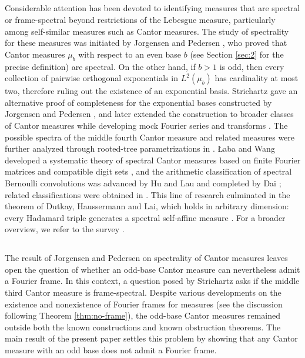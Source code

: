 \documentclass[reqno,a4paper,12pt]{amsart}
\begin{document}
\subsection{}
Considerable attention has been devoted to identifying measures that are spectral or frame-spectral beyond restrictions of the Lebesgue measure, particularly among self-similar measures such as Cantor measures. The study of spectrality for these measures was initiated by
Jorgensen and Pedersen \cite{JorgensenPedersen98}, who proved that Cantor measures $\mu_b$ with respect to an even base $b$ (see Section \ref{sec:2} for the precise definition) are spectral. On the other hand, if $b>1$ is odd, then every collection of pairwise orthogonal exponentials in $L^2(\mu_b)$ has cardinality at most two, therefore ruling out the existence of an exponential basis. Strichartz gave an alternative proof of completeness for the exponential bases constructed by Jorgensen and Pedersen \cite{Strichartz98}, and later extended the construction to broader classes of Cantor measures while developing mock Fourier series and transforms \cite{Strichartz00}. The possible spectra of the middle fourth Cantor measure and related measures were further analyzed through rooted-tree parametrizations in \cite{DutkayHanSun09,Dai16}.  Łaba and Wang developed a systematic theory of spectral Cantor measures based on finite Fourier matrices and compatible digit sets \cite{LabaWang02}, and the arithmetic classification of spectral Bernoulli convolutions was advanced by Hu and Lau \cite{HuLau08} and completed by Dai \cite{Dai12}; related classifications were obtained in \cite{DaiHeLai13,DaiHeLau14}. This line of research culminated in the theorem of Dutkay, Haussermann and Lai, which holds in arbitrary dimension: every Hadamard triple generates a spectral self-affine measure \cite{DutkayHaussermannLai19}. For a broader overview, we refer to the survey \cite{DutkayLaiWang17}.

\subsection{}
The result of Jorgensen and Pedersen on spectrality of Cantor measures leaves open the question of whether an odd-base Cantor measure can nevertheless admit a Fourier frame. In this context, a question posed by Strichartz \cite{Strichartz00} asks if the middle third Cantor measure is frame-spectral.
Despite various developments on the existence and nonexistence of Fourier frames for measures (see the discussion following Theorem \ref{thm:no-frame}), the odd-base Cantor measures remained outside both the known constructions and known obstruction theorems. The main result of the present paper settles this problem by showing that any Cantor measure with an odd base does not admit a Fourier frame.
\end{document}
